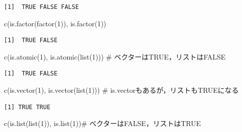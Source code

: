 \documentclass[
  letterpaper,
  DIV=11,
  numbers=noendperiod]{scrreprt}
\newenvironment{Shaded}{\begin{snugshade}}{\end{snugshade}}
\newcommand{\CommentTok}[1]{\textcolor[rgb]{0.37,0.37,0.37}{#1}}
\newcommand{\DecValTok}[1]{\textcolor[rgb]{0.68,0.00,0.00}{#1}}
\newcommand{\FunctionTok}[1]{\textcolor[rgb]{0.28,0.35,0.67}{#1}}
\newcommand{\NormalTok}[1]{\textcolor[rgb]{0.00,0.23,0.31}{#1}}
\begin{document}
\begin{verbatim}
[1]  TRUE FALSE FALSE
\end{verbatim}

\begin{Shaded}
\begin{Highlighting}[]
\FunctionTok{c}\NormalTok{(}\FunctionTok{is.factor}\NormalTok{(}\FunctionTok{factor}\NormalTok{(}\DecValTok{1}\NormalTok{)), }\FunctionTok{is.factor}\NormalTok{(}\DecValTok{1}\NormalTok{))}
\end{Highlighting}
\end{Shaded}

\begin{verbatim}
[1]  TRUE FALSE
\end{verbatim}

\begin{Shaded}
\begin{Highlighting}[]
\FunctionTok{c}\NormalTok{(}\FunctionTok{is.atomic}\NormalTok{(}\DecValTok{1}\NormalTok{), }\FunctionTok{is.atomic}\NormalTok{(}\FunctionTok{list}\NormalTok{(}\DecValTok{1}\NormalTok{))) }\CommentTok{\# ベクターはTRUE，リストはFALSE}
\end{Highlighting}
\end{Shaded}

\begin{verbatim}
[1]  TRUE FALSE
\end{verbatim}

\begin{Shaded}
\begin{Highlighting}[]
\FunctionTok{c}\NormalTok{(}\FunctionTok{is.vector}\NormalTok{(}\DecValTok{1}\NormalTok{), }\FunctionTok{is.vector}\NormalTok{(}\FunctionTok{list}\NormalTok{(}\DecValTok{1}\NormalTok{))) }\CommentTok{\# is.vectorもあるが，リストもTRUEになる}
\end{Highlighting}
\end{Shaded}

\begin{verbatim}
[1] TRUE TRUE
\end{verbatim}

\begin{Shaded}
\begin{Highlighting}[]
\FunctionTok{c}\NormalTok{(}\FunctionTok{is.list}\NormalTok{(}\FunctionTok{list}\NormalTok{(}\DecValTok{1}\NormalTok{)), }\FunctionTok{is.list}\NormalTok{(}\DecValTok{1}\NormalTok{))}\CommentTok{\# ベクターはFALSE，リストはTRUE}
\end{Highlighting}
\end{Shaded}
\end{document}
